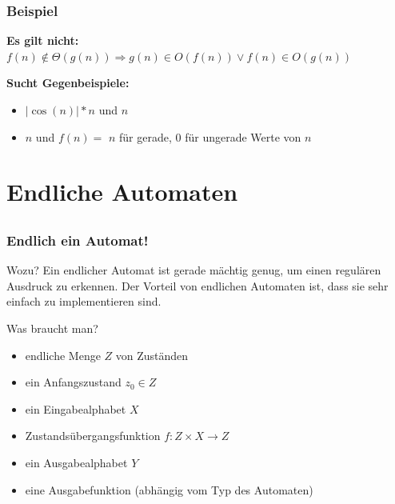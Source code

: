 \begin{frame}
			\frametitle{Beispiel}
		\begin{block}{\bf Es gilt nicht:}
		$f(n) \not\in \Theta(g(n)) \Rightarrow g(n) \in O(f(n)) \vee f(n) \in O(g(n))$
		\end{block}

		\begin{block}{\bf Sucht Gegenbeispiele:}
		\begin{itemize}\pause
			\item $|\cos(n)| * n$ und \pause $n$
			\item $n$ und \pause $f(n)=$ $n$ für gerade, $0$ für ungerade Werte von $n$
		\end{itemize}
		\end{block}
\end{frame}



\section{Endliche Automaten} %
\subsection*{}
\begin{frame}
  \frametitle{Endlich ein Automat!}

  \begin{block}{Wozu?}
    Ein endlicher Automat ist gerade mächtig genug, um einen regulären Ausdruck zu erkennen. Der Vorteil von endlichen Automaten ist, dass sie sehr einfach zu implementieren sind.
  \end{block}
  \pause
  \begin{block}{Was braucht man?}
    \begin{itemize}
      \item endliche Menge $Z$ von Zuständen
      \item ein Anfangszustand $z_0 \in Z$
      \item ein Eingabealphabet $X$
      \item Zustandsübergangsfunktion $f:Z \times X \rightarrow Z$
      \item ein Ausgabealphabet $Y$
      \item eine Ausgabefunktion (abhängig vom Typ des Automaten)
    \end{itemize}
  \end{block}
\end{frame}

